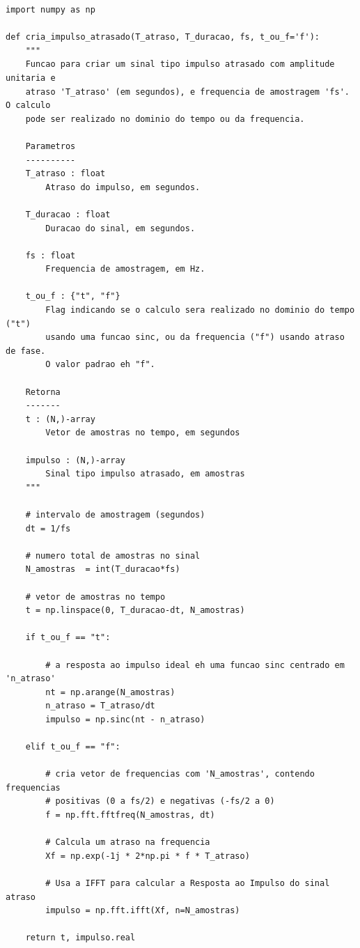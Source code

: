 \documentclass[a4paper,twoside,12pt]{article}
\begin{document}
	\begin{lstlisting}[frame=single]
import numpy as np

def cria_impulso_atrasado(T_atraso, T_duracao, fs, t_ou_f='f'):
    """
    Funcao para criar um sinal tipo impulso atrasado com amplitude unitaria e 
    atraso 'T_atraso' (em segundos), e frequencia de amostragem 'fs'. O calculo
    pode ser realizado no dominio do tempo ou da frequencia.

    Parametros
    ----------
    T_atraso : float
        Atraso do impulso, em segundos.

    T_duracao : float
        Duracao do sinal, em segundos.

    fs : float
        Frequencia de amostragem, em Hz.

    t_ou_f : {"t", "f"}
        Flag indicando se o calculo sera realizado no dominio do tempo ("t") 
        usando uma funcao sinc, ou da frequencia ("f") usando atraso de fase.
        O valor padrao eh "f".

    Retorna
    -------
    t : (N,)-array
        Vetor de amostras no tempo, em segundos

    impulso : (N,)-array
        Sinal tipo impulso atrasado, em amostras
    """

    # intervalo de amostragem (segundos)
    dt = 1/fs

    # numero total de amostras no sinal
    N_amostras  = int(T_duracao*fs)

    # vetor de amostras no tempo
    t = np.linspace(0, T_duracao-dt, N_amostras)

    if t_ou_f == "t":

        # a resposta ao impulso ideal eh uma funcao sinc centrado em 'n_atraso'
        nt = np.arange(N_amostras)
        n_atraso = T_atraso/dt
        impulso = np.sinc(nt - n_atraso)

    elif t_ou_f == "f":

        # cria vetor de frequencias com 'N_amostras', contendo frequencias
        # positivas (0 a fs/2) e negativas (-fs/2 a 0)
        f = np.fft.fftfreq(N_amostras, dt)

        # Calcula um atraso na frequencia
        Xf = np.exp(-1j * 2*np.pi * f * T_atraso)

        # Usa a IFFT para calcular a Resposta ao Impulso do sinal atraso
        impulso = np.fft.ifft(Xf, n=N_amostras)

    return t, impulso.real
	\end{lstlisting}
	
\end{document}
